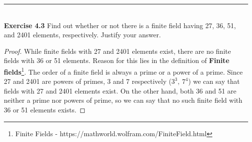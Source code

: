 \documentclass{article}
\begin{document}
\noindent\rule{12cm}{0.4pt}\\
\noindent \textbf{Exercise 4.3} Find out whether or not there is a finite field having 27, 36, 51, and 2401 elements, respectively. Justify your answer.
\begin{proof}
While finite fields with 27 and 2401 elements exist, there are no finite fields with 36 or 51 elements. Reason for this lies in the definition of \textbf{Finite fields}\footnote{Finite Fields - https://mathworld.wolfram.com/FiniteField.html}. The order of a finite field is always a prime or a power of a prime. Since 27 and 2401 are powers of primes, 3 and 7 respectively ($3^3,\ 7^4$) we can say that fields with 27 and 2401 elements exist. On the other hand, both 36 and 51 are neither a prime nor powers of prime, so we can say that no such finite field with 36 or 51 elements exists.
\end{proof}
\end{document}
